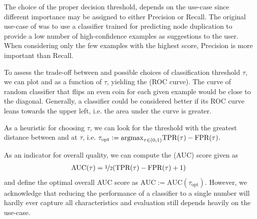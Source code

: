 \documentclass[
	fontsize=10pt, %
	twoside=false, %
	secnumdepth=1, %
  toc=indentunnumbered %
]{kaobook}
\begin{document}
The choice of the proper decision threshold,
depends on the use-case since different importance may be assigned
to either Precision or Recall.
%
The original use-case of \nielsen was to use a classifier trained for predicting
node duplication to provide a low number of high-confidence examples as
suggestions to the user. When considering only the few examples with the highest
score, Precision is more important than Recall.

To assess the trade-off between \FPR and \TPR \wrt possible choices of
classification threshold $\tau$, we can plot \FPR and \TPR as a function of
$\tau$, yielding the  (ROC curve). The
curve of random classifier that flips an even coin for each given example would
be close to the diagonal. 
%
Generally, a classifier could be considered better if its ROC curve leans
towards the upper left, i.e. the area under the curve is greater.

As a heuristic for choosing $\tau$, we can look for the threshold with the greatest
distance between \TPR and \FPR at $\tau$, i.e. $\tau_{\text{opt}} := \argmax_{\tau \in
  (0,1)} \TPR(\tau) - \FPR(\tau)$.

As an indicator for overall quality, we can compute the 
(AUC) score given as
\begin{align*}
  \text{AUC}(\tau) = \nicefrac{1}{2} (\TPR(\tau) - \FPR(\tau) + 1)
\end{align*}
and define the optimal overall AUC score as $\text{AUC} := \text{AUC}(\tau_{\text{opt}})$.
However, we acknowledge that reducing the performance of a classifier to a
single number will hardly ever capture all characteristics and evaluation still
depends heavily on the use-case.



\end{document}
